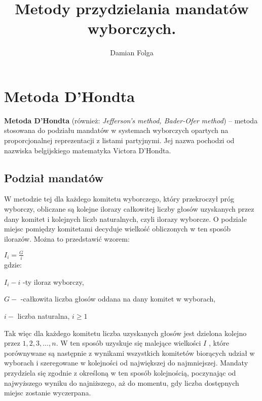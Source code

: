 \documentclass[12pt,a4paper,titlepage]{report}
\author{Damian Folga}
\title{Metody przydzielania mandatów wyborczych.}
\begin{document}
\maketitle
\tableofcontents
\newpage
\chapter{Metoda D'Hondta}
\textbf{Metoda D’Hondta} (również: \textit{Jefferson’s method, Bader-Ofer method}) – metoda stosowana do podziału mandatów w systemach wyborczych opartych na proporcjonalnej reprezentacji z listami partyjnymi. Jej nazwa pochodzi od nazwiska belgijskiego matematyka Victora D’Hondta.
\section{Podział mandatów}
W metodzie tej dla każdego komitetu wyborczego, który przekroczył próg wyborczy, obliczane są kolejne ilorazy całkowitej liczby głosów uzyskanych przez dany komitet i kolejnych liczb naturalnych, czyli ilorazy wyborcze. O podziale miejsc pomiędzy komitetami decyduje wielkość obliczonych w ten sposób ilorazów. Można to przedstawić wzorem:

\begin{math}
I_i=\frac{G}{i}
\end{math} \\
gdzie:

\begin{math}
I_i-i
\end{math}
-ty iloraz wyborczy,

\begin{math}
G-
\end{math}
-całkowita liczba głosów oddana na dany komitet w wyborach,

\begin{math}
i-
\end{math}
liczba naturalna,
\begin{math}
i\geq{1}
\end{math}

Tak więc dla każdego komitetu liczba uzyskanych głosów jest dzielona kolejno przez 
\begin{math} 1,2,3,\dots ,n\end{math}. W ten sposób uzyskuje się malejące wielkości 
\begin{math}
I
\end{math}
, które porównywane są następnie z wynikami wszystkich komitetów biorących udział w wyborach i szeregowane w kolejności od największej do najmniejszej. Mandaty przydziela się zgodnie z określoną w ten sposób kolejnością, poczynając od najwyższego wyniku do najniższego, aż do momentu, gdy liczba dostępnych miejsc zostanie wyczerpana.
\newpage
\end{document}
